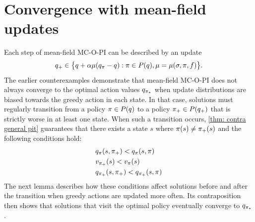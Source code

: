 



\section{Convergence with mean-field updates}


Each step of mean-field MC-O-PI can be described by an update
\begin{align}
\label{eq: definition of q+ greedy section}
    q_+ 
    \in
    \big\{ q + \alpha \mu (q_\pi - q)
    :
    \pi \in P(q)
    ,
    \mu = \mu(\sigma, \pi, f)
    \big\} .
\end{align}
The earlier counterexamples demonstrate that mean-field MC-O-PI does not always converge to the optimal action values $q_{{\pi}_*}$ when update distributions are biased towards the greedy action in each state.
In that case, solutions must regularly transition from a policy $\pi \in P(q)$ to a policy $\pi_+ \in P(q_+)$ that is strictly worse in at least one state.
When such a transition occurs, \autoref{thm: contra general pit} guarantees that there exists a state $s$ where $\pi(s) \neq \pi_+(s)$ and the following conditions hold:
\begin{subequations}
\label{eq: switch to worse}
\begin{align}
        &q_{\pi}(s, \pi_+) < q_{\pi}(s, \pi)
        \\
        &v_{\pi_+}(s) < v_{\pi}(s)
        \\
        &q_{\pi_+}(s, \pi_+) < q_{\pi_+}(s, \pi)
\end{align}
\end{subequations}
The next lemma describes how these conditions affect solutions before and after the transition when greedy actions are updated more often.
Its contraposition then shows that solutions that visit the optimal policy eventually converge to $q_{{\pi}_*}$.

